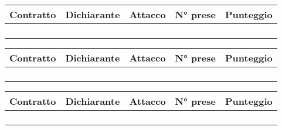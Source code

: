 \documentclass[a4paper, fontsize=20.74pt]{scrreprt}
\begin{document}
\begin{tabular}{||c|c|c|c|c||}
    \hline
    Contratto\hspace{2cm} & Dichiarante & Attacco & N° prese & Punteggio \\
    \hline
              &&&&\\
    \hline
              &&&&\\
    \hline
              &&&&\\
    \hline
              &&&&\\
    \hline
    \end{tabular}
\medskip

\begin{tabular}{||c|c|c|c|c||}
    \hline
    Contratto\hspace{2cm} & Dichiarante & Attacco & N° prese & Punteggio \\
    \hline
              &&&&\\
    \hline
              &&&&\\
    \hline
              &&&&\\
    \hline
              &&&&\\
    \hline
    \end{tabular}
\medskip

\begin{tabular}{||c|c|c|c|c||}
    \hline
    Contratto\hspace{2cm} & Dichiarante & Attacco & N° prese & Punteggio \\
    \hline
              &&&&\\
    \hline
              &&&&\\
    \hline
              &&&&\\
    \hline
              &&&&\\
    \hline
    \end{tabular}
\medskip
\end{document}
